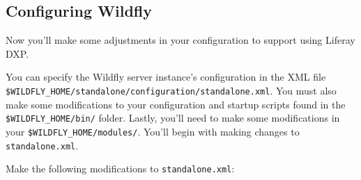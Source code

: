 \subsection{Configuring Wildfly}\label{configuring-wildfly}

Now you'll make some adjustments in your configuration to support using
Liferay DXP.

You can specify the Wildfly server instance's configuration in the XML
file \texttt{\$WILDFLY\_HOME/standalone/configuration/standalone.xml}.
You must also make some modifications to your configuration and startup
scripts found in the \texttt{\$WILDFLY\_HOME/bin/} folder. Lastly,
you'll need to make some modifications in your
\texttt{\$WILDFLY\_HOME/modules/}. You'll begin with making changes to
\texttt{standalone.xml}.

Make the following modifications to \texttt{standalone.xml}:

